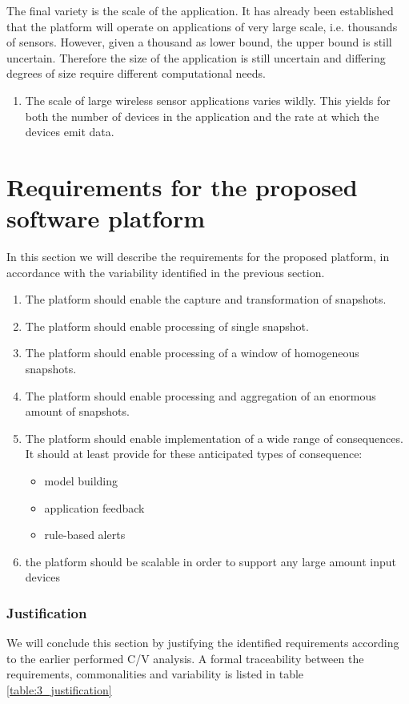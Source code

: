 The final variety is the scale of the application. It has already been established that the platform will operate on applications of very large scale, i.e. thousands of sensors. However, given a thousand as lower bound, the upper bound is still uncertain. Therefore the size of the application is still uncertain and differing degrees of size require different computational needs.
\begin{enumerate}[label=V\archid .\arabic* , resume]
\nospace
\item \label{v:scale} The scale of large wireless sensor applications varies wildly. This yields for both the number of devices in the application and the rate at which the devices emit data.
\end{enumerate}
\section{Requirements for the proposed software platform}
In this section we will describe the requirements for the proposed platform, in accordance with the variability identified in the previous section. 
\begin{enumerate}[label=R\archid .\arabic*]
\nospace
\item \label{r:snaptshot_transformation} The platform should enable the capture and transformation of snapshots.
\item \label{r:basis_single} The platform should enable processing of single snapshot.
\item \label{r:basis_historic} The platform should enable processing of a window of homogeneous snapshots.
\item \label{r:basis_accumulated} The platform should enable processing and aggregation of an enormous amount of snapshots.
\item \label{r:consequence} The platform should enable implementation of a wide range of consequences. It should at least provide for these anticipated types of consequence:
\begin{itemize}
\nospace
\item model building
\item application feedback
\item rule-based alerts
\end{itemize}
\item \label{r:scale} the platform should be scalable in order to support any large amount input devices
\end{enumerate}

\subsubsection*{Justification}
We will conclude this section by justifying the identified requirements according to the earlier performed C/V analysis. A formal traceability between the requirements, commonalities and variability is listed in table \ref{table:3_justification}

